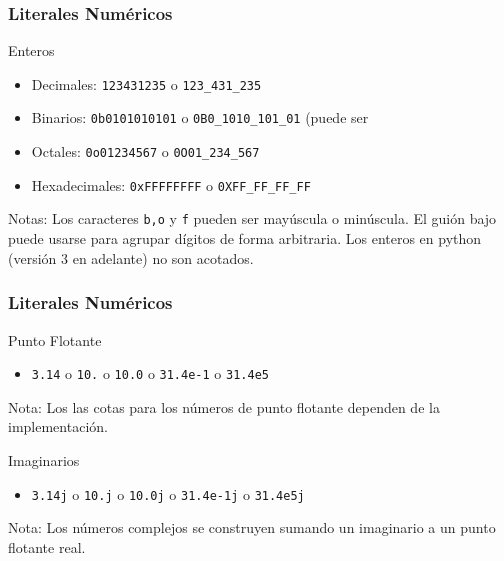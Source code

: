 \documentclass{beamer}
\begin{document}
\begin{frame}[fragile]
\frametitle{Literales Numéricos}
\begin{block}{Enteros}
\begin{itemize}
\item Decimales: \texttt{123431235} o \texttt{123_431_235} 
\item Binarios: \texttt{0b0101010101}  o \texttt{0B0_1010_101_01} (puede ser 
\item Octales: \texttt{0o01234567} o \texttt{0O01_234_567}
\item Hexadecimales: \texttt{0xFFFFFFFF} o \texttt{0XFF_FF_FF_FF}  
\end{itemize}
Notas: Los caracteres {\tt b,o} y {\tt f} pueden ser mayúscula o minúscula. El guión bajo puede usarse para agrupar dígitos de forma arbitraria. Los enteros en python (versión 3 en adelante) no son acotados.
\end{block}
\end{frame}

\begin{frame}[fragile]
\frametitle{Literales Numéricos}
\begin{block}{Punto Flotante}
\begin{itemize}
\item \texttt{3.14} o \texttt{10.} o  \texttt{10.0}  o \texttt{31.4e-1} o  \texttt{31.4e5} 

\end{itemize}
Nota: Los las cotas para los números de punto flotante dependen de la implementación.
\end{block}
\begin{block}{Imaginarios}
\begin{itemize}
\item \texttt{3.14j} o \texttt{10.j} o  \texttt{10.0j}  o \texttt{31.4e-1j} o  \texttt{31.4e5j} 
\end{itemize}
Nota: Los números complejos se construyen sumando un imaginario a un punto flotante real.
\end{block}
\end{frame}
\end{document}
